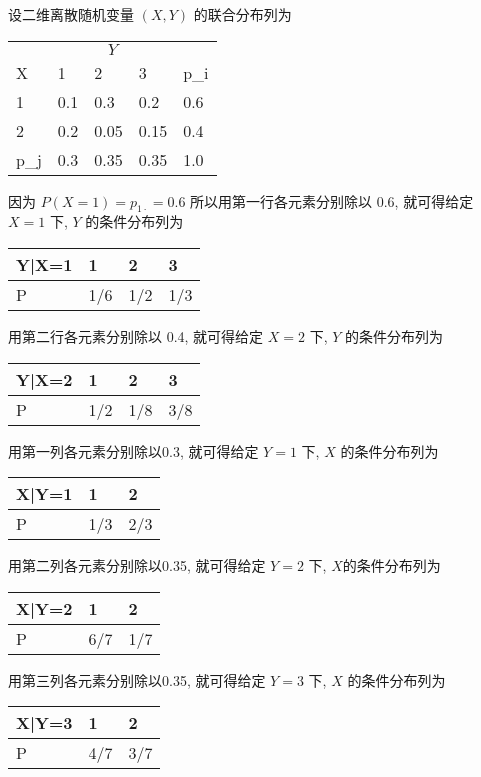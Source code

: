 	\begin{example}\label{exam:3.5.1}
		设二维离散随机变量 $(X,Y)$ 的联合分布列为
		\begin{center}
			\begin{tabularx}{0.8\textwidth}{YYYYY}
			\toprule
			& 	&	\\
			X &	1&	2&	3&	p_{i\cdot}	\\
			&	0.1&	0.3&	0.2&	0.6\\
			2&	0.2&	0.05&	0.15&	0.4\\
			\midrule
			p_{\cdot j}&	0.3&	0.35&	0.35&	1.0\\
			\bottomrule
			\end{tabularx}
		\end{center}
		因为 $P(X=1)=p_{1\cdot}=0.6$ 所以用第一行各元素分别除以 0.6, 就可得给定 $X=1$ 下, $Y$ 的条件分布列为
		\begin{center}
			\begin{tabularx}{0.8\textwidth}{YYYY}
				\toprule
				Y|X=1&	1&	2&	3	\\
				\midrule
				P&	1/6&	1/2&	1/3\\
				\bottomrule
			\end{tabularx}
		\end{center}
		用第二行各元素分别除以 0.4, 就可得给定 $X=2$ 下, $Y$ 的条件分布列为
		\begin{center}
			\begin{tabularx}{0.8\textwidth}{YYYY}
				\toprule
				Y|X=2&	1&	2&	3	\\
				\midrule
				P&	1/2&	1/8&	3/8	\\
				\bottomrule
			\end{tabularx}
		\end{center}
		用第一列各元素分别除以0.3, 就可得给定 $Y=1$ 下, $X$ 的条件分布列为
		\begin{center}
			\begin{tabularx}{0.8\textwidth}{YYY}
				\toprule
				X|Y=1&	1&	2\\
				\midrule
				P&	1/3&	2/3	\\
				\bottomrule
			\end{tabularx}
		\end{center}
		用第二列各元素分别除以0.35, 就可得给定 $Y=2$ 下, $X$的条件分布列为
		\begin{center}
			\begin{tabularx}{0.8\textwidth}{YYY}
				\toprule
				X|Y=2&	1&	2\\
				\midrule
				P&	6/7&	1/7\\
				\bottomrule
			\end{tabularx}
		\end{center}
		用第三列各元素分别除以0.35, 就可得给定 $Y=3$ 下, $X$ 的条件分布列为
		\begin{center}
			\begin{tabularx}{0.8\textwidth}{YYY}
				\toprule
				X|Y=3&	1&	2\\
				\midrule
				P&	4/7&	3/7\\
				\bottomrule
			\end{tabularx}
		\end{center}
	\end{example}
